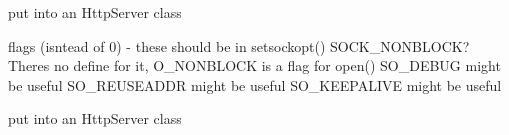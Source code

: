 
\begin{DoxyRefList}
\item[Member \mbox{\hyperlink{socket_8cpp_ae12384871780d23a8e31371d53372090}{read\+Request}} (\mbox{\hyperlink{classTcpSocket}{Tcp\+Socket}} socket, int port)]\label{todo__todo000004}%
%
put into an Http\+Server class  
\item[Member \mbox{\hyperlink{classTcpSocket_a132aa72af141d611f8bad96ba585a79f}{Tcp\+Socket\+::Tcp\+Socket}} ()]\label{todo__todo000003}%
%
flags (isntead of 0) -\/ these should be in setsockopt() SOCK\+\_\+\+NONBLOCK? There\textquotesingle{}s no define for it, O\+\_\+\+NONBLOCK is a flag for open() SO\+\_\+\+DEBUG might be useful SO\+\_\+\+REUSEADDR might be useful SO\+\_\+\+KEEPALIVE might be useful  
\item[Member \mbox{\hyperlink{socket_8cpp_a1a8714346b2d11ab73e94d6e551aab18}{write\+Response}} (int port, \mbox{\hyperlink{classTcpSocket}{Tcp\+Socket}} socket, \mbox{\hyperlink{structResponse}{Response}} response)]\label{todo__todo000005}%
%
put into an Http\+Server class 
\end{DoxyRefList}